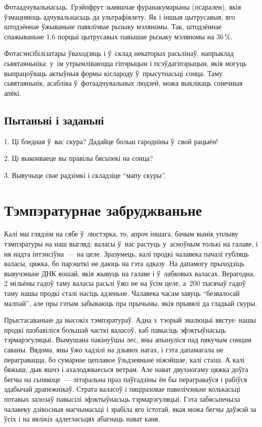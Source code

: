 Фотаадчувальнасьць. Грэйпфрут зьмяшчае фуранакумарыны (псарален), якія ўзмацняюць адчувальнасьць да ультрафіялету. Як і іншыя цытрусавыя, яго штодзённае ўжываньне павялічвае рызыку мэляномы. Так, штодзённае спажываньне 1,6 порцыі цытрусавых павышае рызыку мэляномы на 36\,\%. 

Фотасэнсібілізатары ўваходзяць і ў~склад некаторых расьлінаў, напрыклад сьвятаяньніка: у~ім утрымліваюцца гіпэрыцын і псэўдагіпэрыцын, якія могуць выпрацоўваць актыўныя формы кіслароду ў~прысутнасьці сонца. Таму сьвятаяньнік, асабліва ў~фотаадчувальных людзей, можа выклікаць сонечныя апёкі.

\subsection*{Пытаньні і заданьні}

1. Ці бледная ў~вас скура? Дадайце больш гародніны ў~свой рацыён!

2. Ці выконваеце вы правілы бясьпекі на сонца?

3. Вывучыце свае радзімкі і складзіце ``мапу скуры''.


\section{Тэмпэратурнае забруджваньне}

Калі мы глядзім на сябе ў~люстэрка, то, апроч іншага, бачым вынік уплыву тэмпэратуры на наш выгляд: валасы ў~нас растуць у~асноўным толькі на галаве, і ня надта інтэнсіўна~--- на целе. Зразумець, калі продкі чалавека пачалі губляць валасы, цяжка, бо парэшткі не даюць на гэта адказу. На дапамогу прыходзіць вывучэньне ДНК вошай, якія жывуць на галаве і ў~лабковых валасах. Верагодна, 2 мільёны гадоў таму валасы расьлі ўжо не на ўсім целе, а~200 тысячаў гадоў таму нашы продкі сталі насіць адзеньне. Чалавека часам завуць ``безвалосай малпай'', але пры гэтым забываюць пра прычыны, якія прывялі да гладкай скуры.

Прыстасаваньне да высокіх тэмпэратураў. Адна з~тэорый эвалюцыі вястуе: нашы продкі пазбавіліся большай часткі валасоў, каб павысіць эфэктыўнасьць тэрмарэгуляцыі. Вымушана пакінуўшы лес, яны апынуліся пад пякучым сонцам саваны. Вядома, яны ўжо хадзілі на дзьвюх нагах, і гэта дапамагала не перагравацца, бо сумарнае цеплавое ўзьдзеяньне ніжэйшае, калі стаіш. А калі бяжыш, дык яшчэ і ахалоджваесься ветрам. Але нават двухногаму цяжка доўга бегчы на сьпякоце~--- літаральна праз паўгадзіны ён бы пераграваўся і рабіўся здабычай драпежнікаў. Страта валасоў і пяціразовае павелічэньне колькасьці потавых залозаў павысілі эфэктыўнасьць тэрмарэгуляцыі. Гэта забясьпечыла чалавеку дзівосныя магчымасьці і зрабіла яго істотай, якая можа бегчы даўжэй за ўсіх і на вялікіх адлегласьцях абагнаць нават каня.

